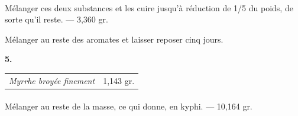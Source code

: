 \documentclass[a4paper, 11pt, oneside, landscape]{article}
\begin{document}
\paragraph{}
Mélanger ces deux substances et les cuire jusqu'à réduction de 1/5 du poids, de sorte qu'il reste. --- 3,360 gr.

Mélanger au reste des aromates et laisser reposer cinq jours.
\begin{center}
\textbf{5.}
\end{center}
\begin{table}[H]
    \centering
    \begin{tabular}{l r}
        \emph{Myrrhe broyée finement} & 1,143 gr. \\
    \end{tabular}
\end{table}
\paragraph{}
Mélanger au reste de la masse, ce qui donne, en kyphi. --- 10,164 gr.
\end{document}
